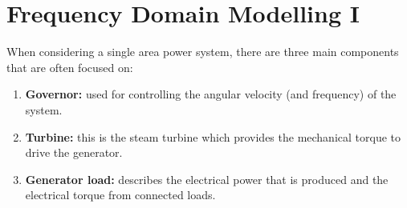 \chapter{Frequency Domain Modelling I}
When considering a single area power system, there are three main components that are often focused on:
\begin{enumerate}
	\item \textbf{Governor:} used for controlling the angular velocity (and frequency) of the system.
	\item \textbf{Turbine:} this is the steam turbine which provides the mechanical torque to drive the generator.
	\item \textbf{Generator load:} describes the electrical power that is produced and the electrical torque from connected loads. 
\end{enumerate}





